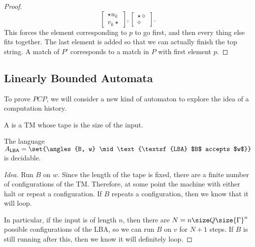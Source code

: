 \documentclass{standalone}
\begin{document}
\begin{proof}
\[{			\begin{bmatrix} \star u_k \\ v_k \star \end{bmatrix},
			\begin{bmatrix} \star \diamond \\ \diamond \end{bmatrix}
		}.
	\]
	This forces the element corresponding to \(p\) to go first, and then every thing else fits together. The last element is added so that we can actually finish the top string. A match of \(P'\) corresponds to a match in \(P\) with first element \(p\).
\end{proof}

\subsection{Linearly Bounded Automata}
To prove \(\mathit{PCP}\), we will consider a new kind of automaton to explore the idea of a computation history.
\begin{definition}
	A  is a \textsf{TM} whose tape is the size of the input.
\end{definition}
\begin{proposition}
	The language \(A_{\textsf{LBA}} = \set{\angles{B, w} \mid \text{\textsf{LBA} $B$ accepts $w$}}\) is decidable.
\end{proposition}
\begin{proof}[Idea]
	Run \(B\) on \(w\). Since the length of the tape is fixed, there are a finite number of configurations of the \textsf{TM}. Therefore, at some point the machine with either halt or repeat a configuration. If \(B\) repeats a configuration, then we know that it will loop.

	In particular, if the input is of length \(n\), then there are \(N = n \size Q \size{\Gamma}^n\) possible configurations of the \textsf{LBA}, so we can run \(B\) on \(v\) for \(N + 1\) steps. If \(B\) is still running after this, then we know it will definitely loop.
\end{proof}
\end{document}
